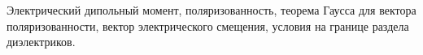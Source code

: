 \documentclass[__main__.tex]{subfiles}
\begin{document}
Электрический дипольный момент, поляризованность, теорема Гаусса для вектора поляризованности, вектор электрического смещения, условия на границе раздела диэлектриков.\\ 

\end{document}
